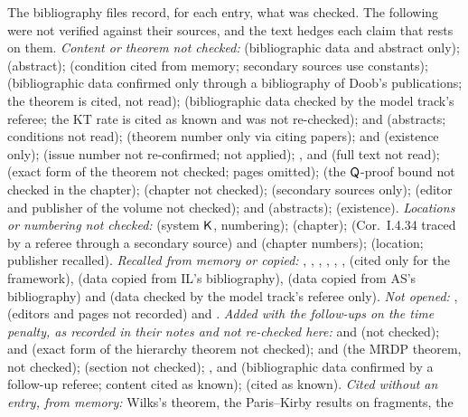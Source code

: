 The bibliography files record, for each entry, what was checked. The following were not verified against their sources, and the text hedges each claim that rests on them. \emph{Content or theorem not checked:} \citet{hutter2007universal} (bibliographic data and abstract only); \citet{leike2015solomonoff} (abstract); \citet{gaifman1964concerning} (condition cited from memory; secondary sources use constants); \citet{doob1949application} (bibliographic data confirmed only through a bibliography of Doob's publications; the theorem is cited, not read); \citet{krichevsky1981performance} (bibliographic data checked by the model track's referee; the KT rate is cited as known and was not re-checked); \citet{berk1966limiting} and \citet{kleijn2006misspecification} (abstracts; conditions not read); \citet{ghosal2017fundamentals} (theorem number only via citing papers); \citet{horning1969study} and \citet{angluin1988identifying} (existence only); \citet{rousseau2011asymptotic} (issue number not re-confirmed; not applied); \citet{craig1953axiomatizability}, \citet{seiferas1978separating} and \citet{zak1983turing} (full text not read); \citet{cook1972hierarchy} (exact form of the theorem not checked; pages omitted); \citet{pudlak1998lengths} (the $\mathsf{Q}$-proof bound not checked in the chapter); \citet{boolos2007computability} (chapter not checked); \citet{shepherdson1964nonstandard} (secondary sources only); \citet{zarach1996replacement} (editor and publisher of the volume not checked); \citet{gitman2016zfc} and \citet{kaye2007interpretations} (abstracts); \citet{kaye1988parameter} (existence). \emph{Locations or numbering not checked:} \citet{mendelson1997introduction} (system $\mathsf{K}$, numbering); \citet{athreya1972branching} (chapter); \citet{hajek1993metamathematics} (Cor.~I.4.34 traced by a referee through a secondary source) and \citet{kaye1991models} (chapter numbers); \citet{shoenfield1967mathematical} (location; publisher recalled). \emph{Recalled from memory or copied:} \citet{church1936note}, \citet{turing1936computable}, \citet{birkhoff1935structure}, \citet{schwarz1978estimating}, \citet{clarke1990information}, \citet{hoeffding1963probability}, \citet{shafer1976mathematical} (cited only for the framework), \citet{ville1939etude} (data copied from IL's bibliography), \citet{rylln1952axiomatizability} (data copied from AS's bibliography) and \citet{schwartz1965bayes} (data checked by the model track's referee only). \emph{Not opened:} \citet{parikh1973some}, \citet{baaz1993kreisel} (editors and pages not recorded) and \citet{hrubes2007theories}. \emph{Added with the follow-ups on the time penalty, as recorded in their notes and not re-checked here:} \citet{chandra1981alternation} and \citet{book1970time} (not checked); \citet{hartmanis1965computational} and \citet{hennie1966two} (exact form of the hierarchy theorem not checked); \citet{matiyasevich1970enumerable} and \citet{davis1973hilbert} (the MRDP theorem, not checked); \citet{rogers1967theory} (section not checked); \citet{cook1979relative}, \citet{johnson1988generating} and \citet{legg2006elegant} (bibliographic data confirmed by a follow-up referee; content cited as known); \citet{elias1975universal} (cited as known). \emph{Cited without an entry, from memory:} Wilks's theorem, the Paris--Kirby results on fragments, the 